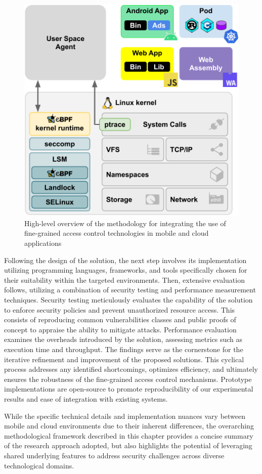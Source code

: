 \begin{figure}[t]
    \centering
    \includegraphics[width=0.8\columnwidth]{
        chapters/methodology/fig/methodology
    }
    \caption[High-level overview of the research methodology]{
        High-level overview of the methodology for integrating the use
        of fine-grained access control technologies in mobile and
        cloud applications
    }
    \label{fig:methodology}
\end{figure}

Following the design of the solution, the next step involves its
implementation utilizing programming languages, frameworks, and tools
specifically chosen for their suitability within the targeted
environments. Then, extensive evaluation follows, utilizing a
combination of security testing and performance measurement
techniques. Security testing meticulously evaluates the capability of
the solution to enforce security policies and prevent unauthorized
resource access. This consists of reproducing common vulnerabilities
classes and public proofs of concept to appraise the ability to
mitigate attacks. Performance evaluation examines the overheads
introduced by the solution, assessing metrics such as execution time
and throughput. The findings serve as the cornerstone for the
iterative refinement and improvement of the proposed solutions. This
cyclical process addresses any identified shortcomings, optimizes
efficiency, and ultimately ensures the robustness of the fine-grained
access control mechanisms. Prototype implementations are open-source
to promote reproducibility of our experimental results and ease of
integration with existing systems.

While the specific technical details and implementation nuances
vary between mobile and cloud environments due to their inherent
differences, the overarching methodological framework described in
this chapter provides a concise summary of the research approach
adopted, but also highlights the potential of leveraging shared
underlying features to address security challenges across diverse
technological domains.
